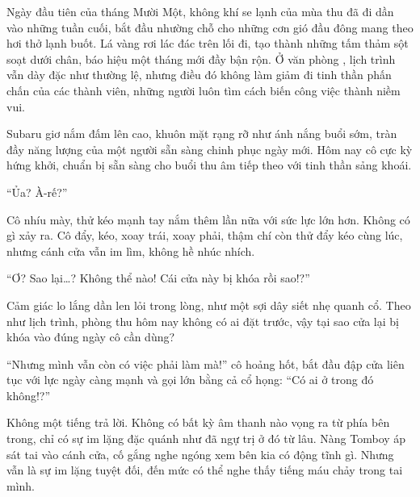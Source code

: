 \documentclass[../main.tex]{subfiles}
\begin{document}

Ngày đầu tiên của tháng Mười Một, không khí se lạnh của mùa thu đã đi dần vào những tuần cuối, bắt đầu nhường chỗ cho những cơn gió đầu đông mang theo hơi thở lạnh buốt. Lá vàng rơi lác đác trên lối đi, tạo thành những tấm thảm sột soạt dưới chân, báo hiệu một tháng mới đầy bận rộn. Ở văn phòng \hll, lịch trình vẫn dày đặc như thường lệ, nhưng điều đó không làm giảm đi tinh thần phấn chấn của các thành viên, những người luôn tìm cách biến công việc thành niềm vui.

Subaru giơ nắm đấm lên cao, khuôn mặt rạng rỡ như ánh nắng buổi sớm, tràn đầy năng lượng của một người sẵn sàng chinh phục ngày mới. Hôm nay cô cực kỳ hứng khởi, chuẩn bị sẵn sàng cho buổi thu âm tiếp theo với tinh thần sảng khoái.

``Ủa? À-rế?''

Cô nhíu mày, thử kéo mạnh tay nắm thêm lần nữa với sức lực lớn hơn. Không có gì xảy ra. Cô đẩy, kéo, xoay trái, xoay phải, thậm chí còn thử đẩy kéo cùng lúc, nhưng cánh cửa vẫn im lìm, không hề nhúc nhích.


``Ơ? Sao lại\dots? Không thể nào! Cái cửa này bị khóa rồi sao!?''

Cảm giác lo lắng dần len lỏi trong lòng, như một sợi dây siết nhẹ quanh cổ. Theo như lịch trình, phòng thu hôm nay không có ai đặt trước, vậy tại sao cửa lại bị khóa vào đúng ngày cô cần dùng?

``Nhưng mình vẫn còn có việc phải làm mà!'' cô hoảng hốt, bắt đầu đập cửa liên tục với lực ngày càng mạnh và gọi lớn bằng cả cổ họng: ``Có ai ở trong đó không!?''

Không một tiếng trả lời. Không có bất kỳ âm thanh nào vọng ra từ phía bên trong, chỉ có sự im lặng đặc quánh như đã ngự trị ở đó từ lâu. Nàng Tomboy áp sát tai vào cánh cửa, cố gắng nghe ngóng xem bên kia có động tĩnh gì. Nhưng vẫn là sự im lặng tuyệt đối, đến mức có thể nghe thấy tiếng máu chảy trong tai mình.
\end{document}
